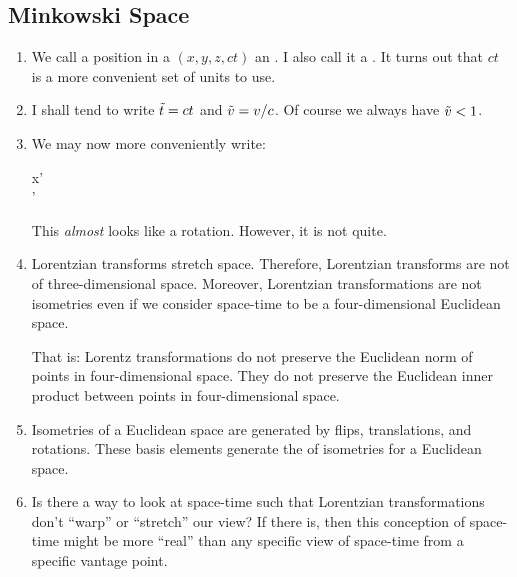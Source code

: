 \subsection{Minkowski Space}

\begin{enumerate}

  \item We call a position in a  $(x, y, z, ct)$ an
  . I also call it a . It turns out
  that $ct$ is a more convenient set of units to use.

  \item I shall tend to write $\tilde{t} = ct$ and $\tilde{v} = v/c$. Of
  course we always have $\tilde{v} < 1$.

  \item We may now more conveniently write:

  \begin{nedqn}
    x'
  \eqcol
  \\
    \ttilde'
  \eqcol
  \end{nedqn}

  This \emph{almost} looks like a rotation. However, it is not
  quite.

  \item Lorentzian transforms stretch space. Therefore, Lorentzian
  transforms are not  of three-dimensional space.
  Moreover, Lorentzian transformations are not isometries even if we
  consider space-time to be a four-dimensional Euclidean space.

  That is: Lorentz transformations do not preserve the Euclidean norm of
  points in four-dimensional space. They do not preserve the Euclidean
  inner product between points in four-dimensional space.

  \item Isometries of a Euclidean space are generated by flips,
  translations, and rotations. These basis elements generate the
   of isometries for a Euclidean space.

  \item Is there a way to look at space-time such that Lorentzian
  transformations don't ``warp'' or ``stretch'' our view? If there is,
  then this conception of space-time might be more ``real'' than any
  specific view of space-time from a specific vantage point.


\end{enumerate}
